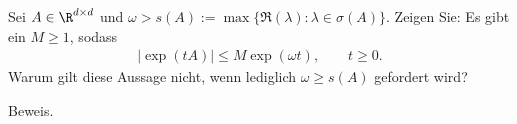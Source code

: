 \begin{exercise}
Sei $A \in \R^{d \times d}$ und $\omega > s(A) := \max \{\Re(\lambda): \lambda \in \sigma(A)\}$.
Zeigen Sie: Es gibt ein $M \geq 1$, sodass
\begin{align*}
  |\exp(tA)| \leq M\exp(\omega t), \qquad t \geq 0.
\end{align*}
Warum gilt diese Aussage nicht, wenn lediglich $\omega \geq s(A)$ gefordert wird?
\end{exercise}
\begin{solution}
Beweis.
\end{solution}
